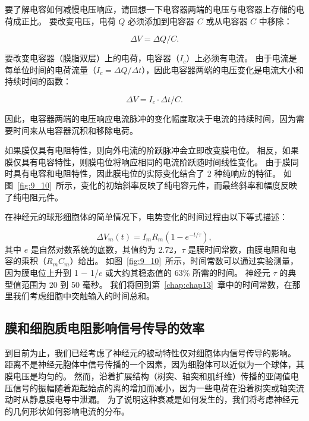 要了解电容如何减慢电压响应，请回想一下电容器两端的电压与电容器上存储的电荷成正比。 
要改变电压，电荷 $Q$ 必须添加到电容器 $C$ 或从电容器 $C$ 中移除：

\begin{equation}
	\Delta V = \Delta Q/C.
\end{equation}


要改变电容器（膜脂双层）上的电荷，电容器（$I_c$）上必须有电流。
由于电流是每单位时间的电荷流量（$I_c = \Delta Q/ \Delta t $），因此电容器两端的电压变化是电流大小和持续时间的函数：

\begin{equation}
	\Delta V = I_c \cdot \Delta t / C.
\end{equation}


因此，电容器两端的电压响应电流脉冲的变化幅度取决于电流的持续时间，因为需要时间来从电容器沉积和移除电荷。


如果膜仅具有电阻特性，则向外电流的阶跃脉冲会立即改变膜电位。
相反，如果膜仅具有电容特性，则膜电位将响应相同的电流阶跃随时间线性变化。
由于膜同时具有电容和电阻特性，因此膜电位的实际变化结合了 2 种纯响应的特征。
如图~\ref{fig:9_10}~所示，变化的初始斜率反映了纯电容元件，而最终斜率和幅度反映了纯电阻元件。


在神经元的球形细胞体的简单情况下，电势变化的时间过程由以下等式描述：

\begin{equation}
	\Delta V_m (t) = I_m R_m (1 - e^{-t/\tau}),
\end{equation}
其中 $e$ 是自然对数系统的底数，其值约为 2.72，$\tau$ 是膜时间常数，由膜电阻和电容的乘积（$R_m C_m$）给出。
如图~\ref{fig:9_10}~所示，时间常数可以通过实验测量，因为膜电位上升到 1 − 1/$e$ 或大约其稳态值的 63\% 所需的时间。 
神经元 $\tau$ 的典型值范围为 20 到 50 毫秒。
我们将回到第~\ref{chap:chap13}~章中的时间常数，在那里我们考虑细胞中突触输入的时间总和。



\subsection{膜和细胞质电阻影响信号传导的效率}

到目前为止，我们已经考虑了神经元的被动特性仅对细胞体内信号传导的影响。
距离不是神经元胞体中信号传播的一个因素，因为细胞体可以近似为一个球体，其膜电压是均匀的。
然而，沿着扩展结构（树突、轴突和肌纤维）传播的亚阈值电压信号的振幅随着距起始点的离的增加而减小，因为一些电荷在沿着树突或轴突流动时从静息膜电导中泄漏。
为了说明这种衰减是如何发生的，我们将考虑神经元的几何形状如何影响电流的分布。


